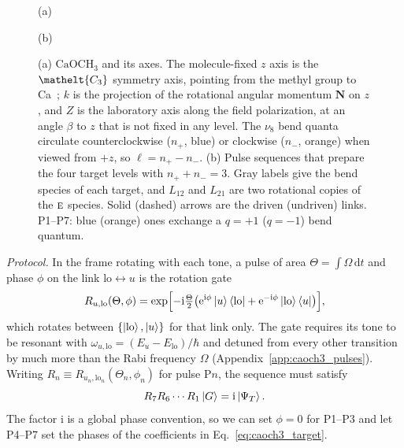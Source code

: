 \documentclass[
  reprint,
  aps,
  prx,
  superscriptaddress,
  amsmath,
  amssymb,
  longbibliography
]{revtex4-2}
\newcommand{\eltfont}[1]{{\let\sigma\eltsigma\mathelt{#1}}}
\newcommand{\irr}[1]{\text{\normalfont\scshape #1}}
\newcommand{\elt}[1]{\eltfont{#1}}
\newcommand{\iunit}{\mathrm{i}}
\newcommand{\expe}{\mathrm{e}}
\newcommand{\diff}{\mathrm{d}}
\begin{document}
\begin{figure}[tb]
\centering
\begin{minipage}[b]{0.345\columnwidth}\raggedright
{\small (a)}\\[-1pt]

\end{minipage}\hfill
\begin{minipage}[b]{0.645\columnwidth}\raggedright
{\small (b)}\\[-1pt]

\end{minipage}
\caption{(a) $\mathrm{CaOCH_3}$ and its axes. The molecule-fixed $z$ axis is the $\elt{C_{3}}$ symmetry axis, pointing from the methyl group to Ca~\cite{Mitra2020}; $k$ is the projection of the rotational angular momentum $\mathbf N$ on $z$, and $Z$ is the laboratory axis along the field polarization, at an angle $\beta$ to $z$ that is not fixed in any level. The $\nu_8$ bend quanta circulate counterclockwise ($n_+$, blue) or clockwise ($n_-$, orange) when viewed from $+z$, so $\ell=n_+-n_-$. (b) Pulse sequences that prepare the four target levels with $n_+ + n_-=3$. Gray labels give the bend species of each target, and $L_{12}$ and $L_{21}$ are two rotational copies of the $\irr{e}$ species. Solid (dashed) arrows are the driven (undriven) links. P1--P7: blue (orange) ones exchange a $q=+1$ ($q=-1$) bend quantum.}
\label{fig:caoch3_tree}
\end{figure}

\emph{Protocol.} In the frame rotating with each tone, a pulse of area $\Theta=\int\Omega\,\diff t$ and phase $\phi$ on the link $\mathrm{lo}\leftrightarrow u$ is the rotation gate~\cite{AllenEberly1975}
\begin{equation}
R_{u,\mathrm{lo}}(\Theta,\phi)=\exp\Bigl[-\iunit\tfrac{\Theta}{2}\bigl(\expe^{\iunit\phi}\ket{u}\bra{\mathrm{lo}}+\expe^{-\iunit\phi}\ket{\mathrm{lo}}\bra{u}\bigr)\Bigr],
\label{eq:caoch3_gate}
\end{equation}
which rotates between $\{\ket{\mathrm{lo}},\ket{u}\}$ for that link only. The gate requires its tone to be resonant with $\omega_{u,\mathrm{lo}}=(E_u-E_{\mathrm{lo}})/\hbar$ and detuned from every other transition by much more than the Rabi frequency $\Omega$ (Appendix~\ref{app:caoch3_pulses}). Writing $R_n\equiv R_{u_n,\mathrm{lo}_n}(\Theta_n,\phi_n)$ for pulse P$n$, the sequence must satisfy
\begin{equation}
R_7R_6\cdots R_1\ket{G}=\iunit\ket{\Psi_T}.
\label{eq:caoch3_sequence}
\end{equation}
The factor $\iunit$ is a global phase convention, so we can set $\phi=0$ for P1--P3 and let P4--P7 set the phases of the coefficients in Eq.~\eqref{eq:caoch3_target}. 
\end{document}
